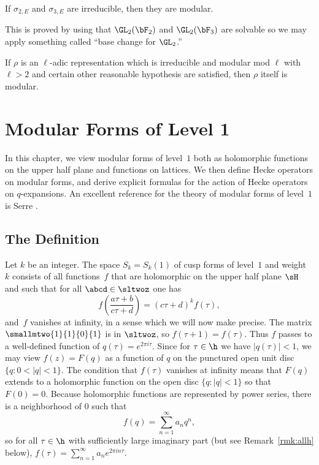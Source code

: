 \documentclass{report}
\begin{document}
\begin{theorem}
If $\sigma_{2,E}$ and $\sigma_{3,E}$ are irreducible, then they
are modular.
\end{theorem}

This is proved by using that $\GL_2(\bF_2)$ and
$\GL_2(\bF_3)$ are solvable so we may apply something called
``base change for $\GL_2$.''


\begin{theorem}[Wiles]
If $\rho$ is an $\ell$-adic representation which is irreducible
and modular mod $\ell$ with $\ell>2$ and certain other reasonable
hypothesis are satisfied, then $\rho$ itself is modular.
\end{theorem}
 \chapter{Modular Forms of Level 1}

In this chapter, we view modular forms of level~$1$ both as
holomorphic functions on the upper half plane and functions on
lattices.   We then define Hecke operators on modular forms, and
derive explicit formulas for the action of Hecke operators on
$q$-expansions. An excellent reference for the theory of modular
forms of level~$1$ is Serre \cite[Ch.~7]{serre:arithmetic}.

\section{The Definition} Let $k$ be an integer.  The space
$S_k=S_k(1)$ of cusp forms of level~$1$ and weight~$k$ consists of
all functions~$f$ that are holomorphic on the upper half plane
$\sH$ and such that for all $\abcd\in\sltwoz$ one has
\begin{equation}\label{eqn:modformtrans}
f\left(\frac{a\tau+b}{c\tau+d}\right)=(c\tau+d)^k f(\tau),
\end{equation}
and~$f$ vanishes at infinity, in a sense which we will now make
precise.  The matrix $\smallmtwo{1}{1}{0}{1}$ is in $\sltwoz$, so
$f(\tau+1)=f(\tau)$.  Thus $f$ passes to a well-defined function
of $q(\tau)=e^{2\pi i\tau}$. Since for $\tau\in\h$ we have
$|q(\tau)|<1$, we may view $f(z)=F(q)$ as a function of $q$ on the
punctured open unit disc $\{q:0<|q|<1\}$.  The condition that
$f(\tau)$ vanishes at infinity means that $F(q)$ extends to a
holomorphic function on the open disc $\{q:|q|<1\}$ so that
$F(0)=0$.  Because holomorphic functions are represented by power
series, there is a neighborhood of $0$ such that
\[f(q)=\sum_{n=1}^{\infty}a_n q^n,\]
so for all $\tau\in\h$ with sufficiently large imaginary part (but
see Remark~\ref{rmk:allh} below),
$f(\tau) = \sum_{n=1}^{\infty} a_n e^{2\pi i n\tau}$.
\end{document}
